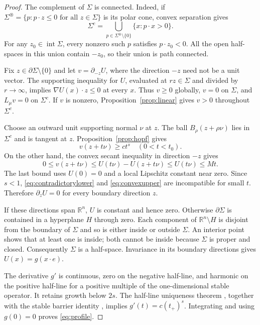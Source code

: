 \documentclass[11pt]{article}
\numberwithin{equation}{section}
\theoremstyle{remark}
\newcommand{\R}{\mathbb R}
\begin{document}
\begin{proof}
The complement of $\Sigma$ is connected. Indeed, if
$\Sigma^\circledast=\{p:p\cdot z\le0\text{ for all }z\in\Sigma\}$ is its polar cone, convex separation gives
\[
 \Sigma^c=\bigcup_{p\in\Sigma^\circledast\setminus\{0\}}\{x:p\cdot x>0\}.
\]
For any $z_0\in\operatorname{int}\Sigma$, every nonzero such $p$ satisfies $p\cdot z_0<0$. All the open half-spaces in this union contain $-z_0$, so their union is path connected.

Fix $z\in\partial\Sigma\setminus\{0\}$ and let $v=\partial_{-z}U$, where the direction $-z$ need not be a unit vector. The supporting inequality for $U$, evaluated at $rz\in\Sigma$ and divided by $r\to\infty$, implies
$\nabla U(x)\cdot z\le0$ at every $x$. Thus $v\ge0$ globally, $v=0$ on $\Sigma$, and $L_\mu v=0$ on $\Sigma^c$. If $v$ is nonzero, Proposition~\ref{prop:linear} gives $v>0$ throughout $\Sigma^c$.

Choose an outward unit supporting normal $\nu$ at $z$. The ball
$B_\rho(z+\rho\nu)$ lies in $\Sigma^c$ and is tangent at $z$. Proposition~\ref{prop:hopf} gives
\begin{equation}\label{eq:contradictorylower}
 v(z+t\nu)\ge ct^s\quad(0<t<t_0).
\end{equation}
On the other hand, the convex secant inequality in direction $-z$ gives
\begin{equation}\label{eq:convexupper}
 0\le v(z+t\nu)
 \le U(t\nu)-U(z+t\nu)
 \le U(t\nu)\le Mt.
\end{equation}
The last bound uses $U(0)=0$ and a local Lipschitz constant near zero. Since $s<1$, \eqref{eq:contradictorylower} and \eqref{eq:convexupper} are incompatible for small $t$. Therefore $\partial_zU=0$ for every boundary direction $z$.

If these directions span $\R^n$, $U$ is constant and hence zero. Otherwise $\partial\Sigma$ is contained in a hyperplane $H$ through zero. Each component of $\R^n\setminus H$ is disjoint from the boundary of $\Sigma$ and so is either inside or outside $\Sigma$. An interior point shows that at least one is inside; both cannot be inside because $\Sigma$ is proper and closed. Consequently $\Sigma$ is a half-space. Invariance in its boundary directions gives $U(x)=g(x\cdot e)$.

The derivative $g'$ is continuous, zero on the negative half-line, and harmonic on the positive half-line for a positive multiple of the one-dimensional stable operator. It retains growth below $2s$. The half-line uniqueness theorem \cite[Theorem 1.1]{GRO}, together with the stable barrier identity \cite[Lemma 2.6.2]{FRO}, implies $g'(t)=c(t_+)^s$. Integrating and using $g(0)=0$ proves \eqref{eq:profile}.
\end{proof}
\end{document}
